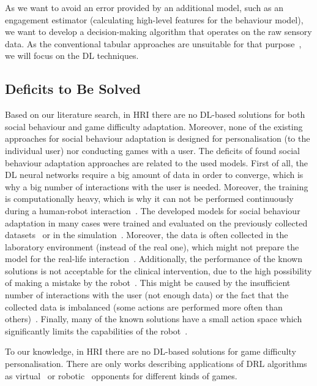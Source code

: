 \documentclass[thesis]{mas_proposal}
\begin{document}
As we want to avoid an error provided by an additional model, such as an engagement estimator (calculating high-level features for the behaviour model), we want to develop a decision-making algorithm that operates on the raw sensory data. As the conventional tabular approaches are unsuitable for that purpose~\cite{akalin2021reinforcement}, we will focus on the DL techniques.

\subsection{Deficits to Be Solved}
Based on our literature search, in HRI there are no DL-based solutions for both social behaviour and game difficulty adaptation. Moreover, none of the existing approaches for social behaviour adaptation is designed for personalisation (to the individual user) nor conducting games with a user. The deficits of found social behaviour adaptation approaches are related to the used models. First of all, the DL neural networks require a big amount of data in order to converge, which is why a big number of interactions with the user is needed. Moreover, the training is computationally heavy, which is why it can not be performed continuously during a human-robot interaction~\cite{Qureshi2016,Qureshi2017,Qureshi2018,Romeo2019}. The developed models for social behaviour adaptation in many cases were trained and evaluated on the previously collected datasets~\cite{ClarkTurner2017,Romeo2018,Hijaz2021} or in the simulation~\cite{Turner2018,Belo2021,Belo2022}. Moreover, the data is often collected in the laboratory environment (instead of the real one), which might not prepare the model for the real-life interaction~\cite{ClarkTurner2017,Turner2018,Romeo2018}. Additionally, the performance of the known solutions is not acceptable for the clinical intervention, due to the high possibility of making a mistake by the robot~\cite{ClarkTurner2017,Turner2018,Romeo2019,Hijaz2021}. This might be caused by the insufficient number of interactions with the user (not enough data) or the fact that the collected data is imbalanced (some actions are performed more often than others)~\cite{Hijaz2021}. Finally, many of the known solutions have a small action space which significantly limits the capabilities of the robot~\cite{Qureshi2016,Qureshi2017,Qureshi2018,ClarkTurner2017,Turner2018,Belo2021,Belo2022,Romeo2018,Romeo2019}.

To our knowledge, in HRI there are no DL-based solutions for game difficulty personalisation. There are only works describing applications of DRL algorithms as virtual~\cite{mnih2015human,hausknecht2015deep,sorokin2015deep} or robotic~\cite{Cuayahuitl2017,Cuayahuitl2020} opponents for different kinds of games.
\end{document}
